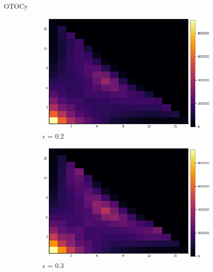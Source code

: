 \documentclass{article}
\begin{document}
\begin{section}{OTOCy}
\begin{figure}[H]
                                      \begin{subfigure}{.33\textwidth}
                                        \centering
                                        \includegraphics[width=1.0\linewidth]{nW0.2.png}
                                      \caption{$\epsilon$ = 0.2}
                                      \end{subfigure}%
                                      \begin{subfigure}{.33\textwidth}
                                        \centering
                                        \includegraphics[width=1.0\linewidth]{nW0.3.png}
                                      \caption{$\epsilon$ = 0.3}
                                    \end{subfigure}%
                                      \begin{subfigure}{.33\textwidth}

\end{subfigure}
\end{figure}
\end{section}
\end{document}
